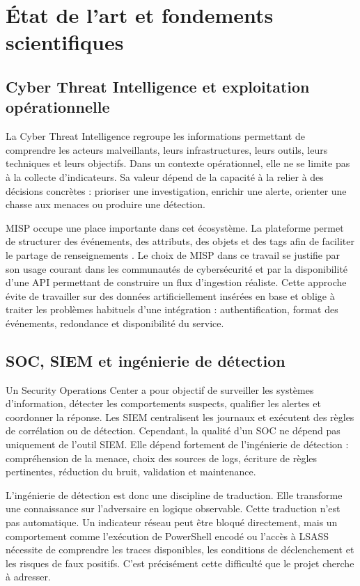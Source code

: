 \chapter{État de l'art et fondements scientifiques}

\section{Cyber Threat Intelligence et exploitation opérationnelle}

La Cyber Threat Intelligence regroupe les informations permettant de comprendre les acteurs malveillants, leurs infrastructures, leurs outils, leurs techniques et leurs objectifs. Dans un contexte opérationnel, elle ne se limite pas à la collecte d'indicateurs. Sa valeur dépend de la capacité à la relier à des décisions concrètes : prioriser une investigation, enrichir une alerte, orienter une chasse aux menaces ou produire une détection.

MISP occupe une place importante dans cet écosystème. La plateforme permet de structurer des événements, des attributs, des objets et des tags afin de faciliter le partage de renseignements \cite{misp}. Le choix de MISP dans ce travail se justifie par son usage courant dans les communautés de cybersécurité et par la disponibilité d'une API permettant de construire un flux d'ingestion réaliste. Cette approche évite de travailler sur des données artificiellement insérées en base et oblige à traiter les problèmes habituels d'une intégration : authentification, format des événements, redondance et disponibilité du service.

\section{SOC, SIEM et ingénierie de détection}

Un Security Operations Center a pour objectif de surveiller les systèmes d'information, détecter les comportements suspects, qualifier les alertes et coordonner la réponse. Les SIEM centralisent les journaux et exécutent des règles de corrélation ou de détection. Cependant, la qualité d'un SOC ne dépend pas uniquement de l'outil SIEM. Elle dépend fortement de l'ingénierie de détection : compréhension de la menace, choix des sources de logs, écriture de règles pertinentes, réduction du bruit, validation et maintenance.

L'ingénierie de détection est donc une discipline de traduction. Elle transforme une connaissance sur l'adversaire en logique observable. Cette traduction n'est pas automatique. Un indicateur réseau peut être bloqué directement, mais un comportement comme l'exécution de PowerShell encodé ou l'accès à LSASS nécessite de comprendre les traces disponibles, les conditions de déclenchement et les risques de faux positifs. C'est précisément cette difficulté que le projet cherche à adresser.

